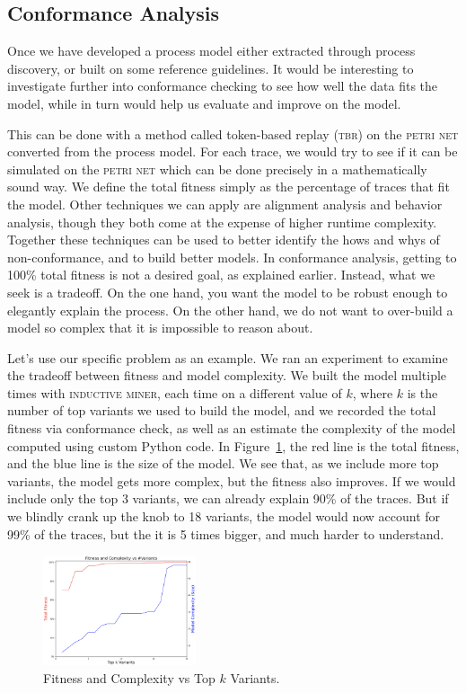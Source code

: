 \documentclass[conference]{IEEEtran}
\begin{document}
\subsection{Conformance Analysis}

Once we have developed a process model either extracted through process
discovery, or built on some reference guidelines. It would be
interesting to investigate further into conformance checking to see how
well the data fits the model, while in turn would help us evaluate and
improve on the model.

This can be done with a method called token-based replay (\textsc{tbr}) on the
\textsc{petri net} converted from the process model. For each trace, we would try
to see if it can be simulated on the \textsc{petri net} which can be done
precisely in a mathematically sound
way. We define the total fitness
simply as the percentage of traces that fit the model. Other techniques
we can apply are 
alignment analysis and behavior analysis, though
they both come at the expense of higher runtime complexity.
Together these techniques can be used to better identify the hows and whys of
non-conformance, and to build better models.
In conformance analysis,
getting to 100\% total fitness is not a desired goal, as explained earlier.
Instead, what we seek is a tradeoff. On the one hand, you want the model
to be robust enough to elegantly explain the process. On the other hand,
we do not want to over-build a model so complex that it is impossible to
reason about.

Let's use our specific problem as an example. We
ran an experiment to examine the tradeoff between fitness and model
complexity. We built the model multiple times with \textsc{inductive miner},
each time on a different value of $k$, where $k$ is the number of top
variants we
used to build the model, and we recorded the total fitness via conformance
check, as well as an estimate the complexity of the model computed using
custom Python code.
In Figure~\ref{fig-tradeoff}, the
red line is the total fitness, and the blue line is the size of the
model. We see that, as we include more top variants, the model gets more
complex, but the fitness also improves. If we would include only the top
3 variants, we can already explain 90\% of the traces. But if we blindly
crank up the knob to 
18 variants, the model would now account for 99\% of the traces, but the
it is 5 times bigger, and much harder to understand.

\begin{figure}[htbp]
\centerline{\includegraphics[width=0.40\textwidth]{images/tradeoff.png}}
\caption{Fitness and Complexity vs Top $k$ Variants.}
\label{fig-tradeoff}
\end{figure}
\end{document}
